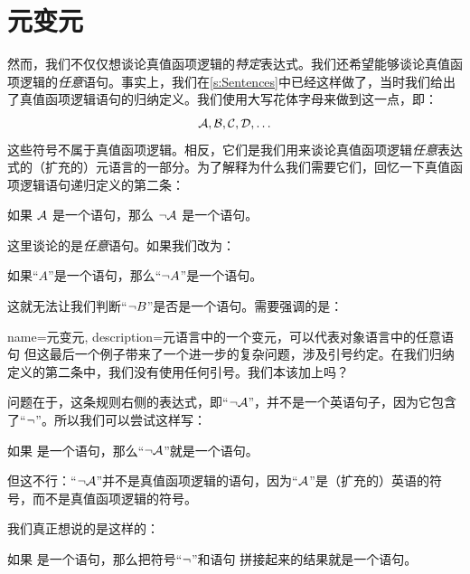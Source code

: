 \section{元变元}\label{s:Metavariables}
然而，我们不仅仅想谈论真值函项逻辑的\emph{特定}表达式。我们还希望能够谈论真值函项逻辑的\emph{任意}语句。事实上，我们在\cref{s:Sentences}中已经这样做了，当时我们给出了真值函项逻辑语句的归纳定义。我们使用大写花体字母来做到这一点，即：
	$$\mathcal{A}, \mathcal{B}, \mathcal{C}, \mathcal{D}, \ldots$$
这些符号不属于真值函项逻辑。相反，它们是我们用来谈论真值函项逻辑\emph{任意}表达式的（扩充的）元语言的一部分。为了解释为什么我们需要它们，回忆一下真值函项逻辑语句递归定义的第二条：
\begin{compactlist}
		\item[2.] 如果 $\mathcal{A}$ 是一个语句，那么 $\neg \mathcal{A}$ 是一个语句。
	\end{compactlist}

这里谈论的是\emph{任意}语句。如果我们改为：
\begin{compactlist}
		\item[2$'$.] 如果“$A$”是一个语句，那么“$\neg A$”是一个语句。
	\end{compactlist}

这就无法让我们判断“$\neg B$”是否是一个语句。需要强调的是：

{
name=元变元,
description={元语言中的一个变元，可以代表对象语言中的任意语句}
}
但这最后一个例子带来了一个进一步的复杂问题，涉及引号约定。在我们归纳定义的第二条中，我们没有使用任何引号。我们本该加上吗？

问题在于，这条规则右侧的表达式，即“$\neg\mathcal{A}$”，并不是一个英语句子，因为它包含了“$\neg$”。所以我们可以尝试这样写：


\begin{numberlist}
		\item[2$''$.] 如果  是一个语句，那么“$\neg \mathcal{A}$”就是一个语句。
	\end{numberlist}


但这不行：“$\neg \mathcal{A}$”并不是真值函项逻辑的语句，因为“$\mathcal{A}$”是（扩充的）英语的符号，而不是真值函项逻辑的符号。

我们真正想说的是这样的：


\begin{numberlist}
		\item[2$'''$.] 如果  是一个语句，那么把符号“$\neg$”和语句  拼接起来的结果就是一个语句。
	\end{numberlist}


